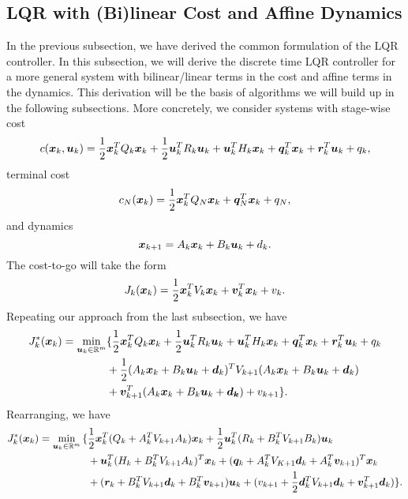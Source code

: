 \subsection{LQR with (Bi)linear Cost and Affine Dynamics}

In the previous subsection, we have derived the common formulation of the LQR controller. In this subsection, we will derive the discrete time LQR controller for a more general system with bilinear/linear terms in the cost and affine terms in the dynamics. This derivation will be the basis of algorithms we will build up in the following subsections. More concretely, we consider systems with stage-wise cost
\begin{equation}
    c(\bm{x}_k, \bm{u}_k) = \frac{1}{2} \bm{x}_k^T Q_k \bm{x}_k + \frac{1}{2} \bm{u}_k^T R_k \bm{u}_k + \bm{u}_k^T H_k \bm{x}_k +\bm{q}_k^T \bm{x}_k + \bm{r}^T_k \bm{u}_k + q_k,
\end{equation}
terminal cost
\begin{equation}
    c_N(\bm{x}_k) = \frac{1}{2} \bm{x}_k^T Q_N \bm{x}_k + \bm{q}_N^T \bm{x}_k + q_N,
\end{equation}
and dynamics
\begin{equation}
    \bm{x}_{k+1} = A_k \bm{x}_k + B_k \bm{u}_k + d_k.
\end{equation}
The cost-to-go will take the form 
\begin{equation}
    J_k(\bm{x}_k) = \frac{1}{2}\bm{x}_k^T V_k \bm{x}_k + \bm{v}_k^T \bm{x}_k + v_k.
\end{equation} 
Repeating our approach from the last subsection, we have
\begin{align}
\label{eq:LQR_rec_cost2}
    J_{k}^*(\bm{x}_{k}) =  \min_{\bm{u}_{k} \in \mathbb{R}^m} & {\large\{} 
    \frac{1}{2} \bm{x}_{k}^T Q_{k} \bm{x}_{k} + \frac{1}{2} \bm{u}_{k}^T R_{k} \bm{u}_{k} + \bm{u}_k^T H_k \bm{x}_k +\bm{q}_k^T \bm{x}_k + \bm{r}^T_k \bm{u}_k + q_k \\
    &+ \frac{1}{2} (A_{k} \bm{x}_{k} + B_{k} \bm{u}_{k} + \bm{d}_k)^T V_{k+1} (A_{k} \bm{x}_{k} + B_{k} \bm{u}_{k} + \bm{d}_k) \nonumber \\
    & + \bm{v}^T_{k+1} (A_{k} \bm{x}_{k} + B_{k} \bm{u}_{k} + \bm{d_k}) + v_{k+1} {\large\}}. \nonumber
\end{align}
Rearranging, we have
\begin{align}
    J_{k}^*(\bm{x}_{k}) = \min_{\bm{u}_{k} \in \mathbb{R}^m} {\Large\{}  
    & \frac{1}{2} \bm{x}_k^T (Q_k + A_k^T V_{k+1} A_k) \bm{x}_k + \frac{1}{2} \bm{u}_k^T (R_k + B_k^T V_{k+1} B_k) \bm{u}_k\\
    & + \bm{u}_k^T (H_k + B_k^T V_{k+1} A_k)^T \bm{x}_k + (\bm{q}_k + A_k^T V_{K+1} \bm{d}_k + A_k^T \bm{v}_{k+1})^T \bm{x}_k \nonumber \\
    & + (\bm{r}_k + B_k^T V_{k+1} \bm{d}_k + B_k^T \bm{v}_{k+1}) \bm{u}_k + (v_{k+1} + \frac{1}{2} \bm{d}_k^T V_{k+1} \bm{d}_k + \bm{v}_{k+1}^T \bm{d}_k) \nonumber
    {\Large\}}.
\end{align}
